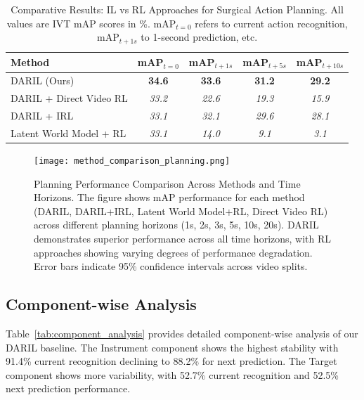 \documentclass[runningheads]{llncs}
\begin{document}
\begin{table}[h]
\centering
\caption{Comparative Results: IL vs RL Approaches for Surgical Action Planning. All values are IVT mAP scores in \%. mAP$_{t=0}$ refers to current action recognition, mAP$_{t+1s}$ to 1-second prediction, etc.}
\label{tab:main_results}
\begin{tabular}{lcccc}
\toprule
\textbf{Method} & \textbf{mAP$_{t=0}$} & \textbf{mAP$_{t+1s}$} & \textbf{mAP$_{t+5s}$} & \textbf{mAP$_{t+10s}$} \\
\midrule
DARIL (Ours) & \textbf{34.6} & \textbf{33.6} & \textbf{31.2} & \textbf{29.2} \\
\midrule
DARIL + Direct Video RL & \textit{33.2} & \textit{22.6} & \textit{19.3} & \textit{15.9} \\
DARIL + IRL & \textit{33.1} & \textit{32.1} & \textit{29.6} & \textit{28.1} \\
Latent World Model + RL & \textit{33.1} & \textit{14.0} & \textit{9.1} & \textit{3.1} \\
\bottomrule
\end{tabular}
\end{table}

\begin{figure}[h]
\centering
\texttt{[image: method\_comparison\_planning.png]}
\caption{Planning Performance Comparison Across Methods and Time Horizons. The figure shows mAP performance for each method (DARIL, DARIL+IRL, Latent World Model+RL, Direct Video RL) across different planning horizons (1s, 2s, 3s, 5s, 10s, 20s). DARIL demonstrates superior performance across all time horizons, with RL approaches showing varying degrees of performance degradation. Error bars indicate 95\% confidence intervals across video splits.}
\label{fig:method_comparison}
\end{figure}

\subsection{Component-wise Analysis}

Table~\ref{tab:component_analysis} provides detailed component-wise analysis of our DARIL baseline. The Instrument component shows the highest stability with 91.4\% current recognition declining to 88.2\% for next prediction. The Target component shows more variability, with 52.7\% current recognition and 52.5\% next prediction performance.
\end{document}

